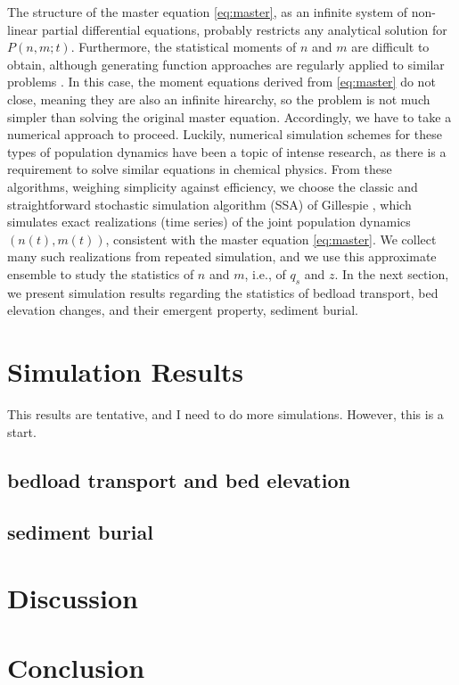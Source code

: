 \documentclass{article}
\begin{document}
The structure of the master equation \ref{eq:master}, as an infinite system of non-linear partial differential equations, probably restricts any analytical solution for $P(n,m ;t)$. 
Furthermore, the statistical moments of $n$ and $m$ are difficult to obtain, although generating function approaches are regularly applied to similar problems \citep{Swift2002}. 
In this case, the moment equations derived from \ref{eq:master} do not close, meaning they are also an infinite hirearchy, so the problem is not much simpler than solving the original master equation. 
Accordingly, we have to take a numerical approach to proceed. 
Luckily, numerical simulation schemes for these types of population dynamics have been a topic of intense research, as there is a requirement to solve similar equations in chemical physics.
From these algorithms, weighing simplicity against efficiency, we choose the classic and straightforward stochastic simulation algorithm (SSA) of Gillespie \citep{Gillespie1977, Gillespie2007}, which simulates exact realizations (time series) of the joint population dynamics $(n(t),m(t))$, consistent with the master equation \ref{eq:master}. 
We collect many such realizations from repeated simulation, and we use this approximate ensemble to study the statistics of $n$ and $m$, i.e., of $q_s$ and $z$. 
In the next section, we present simulation results regarding the statistics of bedload transport, bed elevation changes, and their emergent property, sediment burial. 


\section{Simulation Results} 

This results are tentative, and I need to do more simulations. However, this is a start. 

\subsection{bedload transport and bed elevation}

\subsection{sediment burial} 


\section{Discussion}

\section{Conclusion} 






\end{document}
